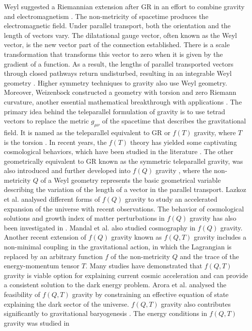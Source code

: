 Weyl suggested a Riemannian extension after GR in an effort to combine gravity and electromagnetism \cite{Weyl/1918}. The non-metricity of spacetime produces the electromagnetic field. Under parallel transport, both the orientation and the length of vectors vary. The dilatational gauge vector, often known as the Weyl vector, is the new vector part of the connection established. There is a scale transformation that transforms this vector to zero when it is given by the gradient of a function. As a result, the lengths of parallel transported vectors through closed pathways return undisturbed, resulting in an integrable Weyl geometry \cite{Scholz/2017,Wheeler/2018}. Higher symmetry techniques to gravity also use Weyl geometry. Moreover, Weizenb$\ddot{o}$ck constructed a geometry with torsion and zero Riemann curvature, another essential mathematical breakthrough with applications \cite{Weitzenbock/1923}. The primary idea behind the teleparallel formulation of gravity is to use tetrad vectors to replace the metric $g_{\mu \nu}$ of the spacetime that describes the gravitational field. It is named as the teleparallel equivalent to GR or $f(T)$ gravity, where $T$ is the torsion \cite{Hayashi/1979}. In recent years, the $f(T)$ theory has yielded some captivating cosmological behaviors, which have been studied in the literature \cite{Benetti/2021,Capozziello/2011a,Mandal/2020,Myrzakulov/2011}. The other geometrically equivalent to GR known as the symmetric teleparallel gravity, was also introduced and further developed into $f(Q)$ gravity \cite{Jimenez/2018}, where the non-metricity $Q$ of a Weyl geometry represents the basic geometrical variable describing the variation of the length of a vector in the parallel transport. Lazkoz et al. \cite{Lazkoz/2019} analysed different forms of $f(Q)$ gravity to study an accelerated expansion of the universe with recent observations. The behavior of cosmological solutions and growth index of matter perturbations in $f(Q)$ gravity has also been investigated in \cite{Khyllep/2021}. Mandal et al. \cite{Mandal/2020a} also studied cosmography in $f(Q)$ gravity. Another recent extension of $f(Q)$ gravity known as $f(Q, T)$ gravity \cite{Xu/2019,2020} includes a non-minimal coupling in the gravitational action, in which the Lagrangian is replaced by an arbitrary function $f$ of the non-metricity $Q$ and the trace of the energy-momentum tensor $T$. Many studies have demonstrated that $f(Q, T)$ gravity is viable option for explaining current cosmic acceleration and can provide a consistent solution to the dark energy problem. Arora et al. \cite{Arora/2021} analysed the feasibility of $f(Q, T)$ gravity by constraining an effective equation of state explaining the dark sector of the universe. $f(Q, T)$ gravity also contributes significantly to gravitational baryogenesis \cite{Bhattacharjee/2020}. The energy conditions in $f(Q, T)$ gravity was studied in \cite{Arora/2021b}
